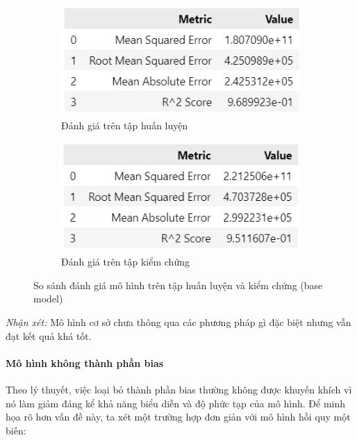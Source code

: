 \begin{figure}[H]
    \centering
    \begin{subfigure}[b]{0.48\textwidth}
        \centering
        \includegraphics[width=\linewidth]{img_multiple/metrics_base_train.png}
        \caption{Đánh giá trên tập huấn luyện}
    \end{subfigure}
    \hfill
    \begin{subfigure}[b]{0.48\textwidth}
        \centering
        \includegraphics[width=\linewidth]{img_multiple/metrics_base_val.png}
        \caption{Đánh giá trên tập kiểm chứng}
    \end{subfigure}
    \caption{So sánh đánh giá mô hình trên tập huấn luyện và kiểm chứng (base model)} 
\end{figure}

\textit{Nhận xét:} Mô hình cơ sở chưa thông qua các phương pháp gì đặc biệt nhưng vẫn đạt kết quả khá tốt. 

\paragraph{Mô hình không thành phần bias}Theo lý thuyết, việc loại bỏ thành phần bias thường không được khuyến khích vì nó làm giảm đáng kể khả năng biểu diễn và độ phức tạp của mô hình. Để minh họa rõ hơn vấn đề này, ta xét một trường hợp đơn giản với mô hình hồi quy một biến:

